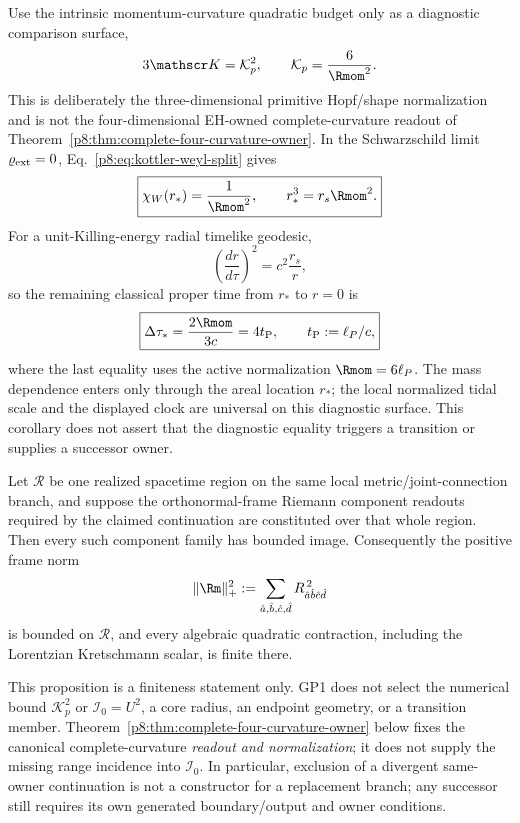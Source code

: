 \documentclass[12pt,a4paper]{article}
\begin{document}
\begin{corollary}
\label{p8:cor:primitive-tidal-diagnostic-surface}
Use the intrinsic momentum-curvature quadratic budget only as a diagnostic
comparison surface,
\[
 3\mathscr K=\mathcal K_p^2,\qquad
 \mathcal K_p=\frac6{\Rmom^2}.
\]
This is deliberately the three-dimensional primitive Hopf/shape normalization
and is not the four-dimensional EH-owned complete-curvature readout of
Theorem~\ref{p8:thm:complete-four-curvature-owner}.
In the Schwarzschild limit \(\varrho_{\rm ext}=0\),
Eq.~\eqref{p8:eq:kottler-weyl-split} gives
\begin{equation}
\label{p8:eq:primitive-tidal-diagnostic}
 \boxed{
 \chi_W(r_*)=\frac1{\Rmom^2},\qquad
 r_*^3=r_s\Rmom^2.}
\end{equation}
For a unit-Killing-energy radial timelike geodesic,
\[
 \left(\frac{dr}{d\tau}\right)^2=c^2\frac{r_s}{r},
\]
so the remaining classical proper time from \(r_*\) to \(r=0\) is
\begin{equation}
\label{p8:eq:primitive-tidal-clock}
 \boxed{
 \Delta\tau_*=\frac{2\Rmom}{3c}=4t_{\rm P},\qquad
 t_{\rm P}:=\ell_P/c,}
\end{equation}
where the last equality uses the active normalization \(\Rmom=6\ell_P\).
The mass dependence enters only through the areal location \(r_*\); the local
normalized tidal scale and the displayed clock are universal on this diagnostic
surface.  This corollary does not assert that the diagnostic equality triggers a
transition or supplies a successor owner.
\end{corollary}

\begin{proposition}
\label{p8:prop:strong-field-gp1-curvature-boundedness}
Let \(\mathcal R\) be one realized spacetime region on the same local
metric/joint-connection branch, and suppose the orthonormal-frame Riemann
component readouts required by the claimed continuation are constituted over
that whole region.  Then every such component family has bounded image.
Consequently the positive frame norm
\[
 \lVert\Rm\rVert_+^2
 :=\sum_{\hat a,\hat b,\hat c,\hat d}
       R_{\hat a\hat b\hat c\hat d}^{\,2}
\]
is bounded on \(\mathcal R\), and every algebraic quadratic contraction,
including the Lorentzian Kretschmann scalar, is finite there.

This proposition is a finiteness statement only.  GP1 does not select the
numerical bound \(\mathcal K_p^2\) or \(\mathcal I_0=U^2\), a core radius,
an endpoint geometry, or a transition member.  Theorem~\ref{p8:thm:complete-four-curvature-owner}
below fixes the canonical complete-curvature \emph{readout and normalization};
it does not supply the missing range incidence into \(\mathcal I_0\).  In
particular, exclusion of a divergent same-owner continuation is not a
constructor for a replacement branch; any successor still requires its own
generated boundary/output and owner conditions.
\end{proposition}
\end{document}
